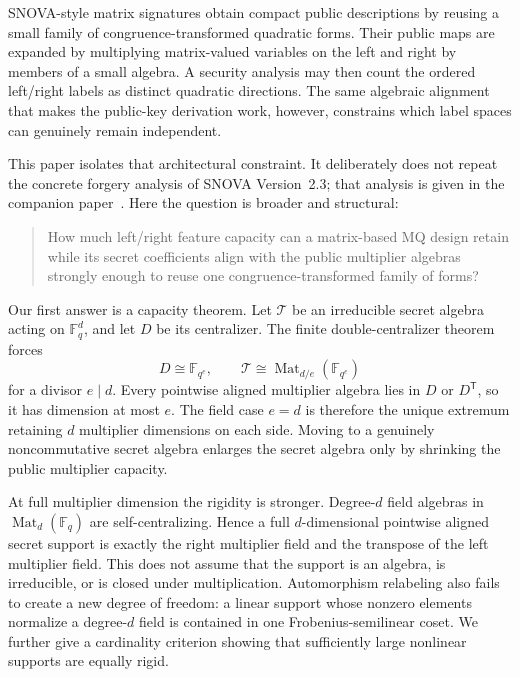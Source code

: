 \documentclass[11pt]{article}
\newcommand{\F}{\mathbb F}
\newcommand{\Mat}{\operatorname{Mat}}
\newcommand{\transpose}{\mathsf T}
\begin{document}
SNOVA-style matrix signatures obtain compact public descriptions by reusing a
small family of congruence-transformed quadratic forms.  Their public maps are
expanded by multiplying matrix-valued variables on the left and right by
members of a small algebra.  A security analysis may then count the ordered
left/right labels as distinct quadratic directions.  The same algebraic
alignment that makes the public-key derivation work, however, constrains which
label spaces can genuinely remain independent.

This paper isolates that architectural constraint.  It deliberately does not
repeat the concrete forgery analysis of SNOVA Version~2.3; that analysis is
given in the companion paper~\cite{ThalerEtAl2026SymmetryQuotient}.  Here the
question is broader and structural:

\begin{quote}
How much left/right feature capacity can a matrix-based MQ design retain while
its secret coefficients align with the public multiplier algebras strongly
enough to reuse one congruence-transformed family of forms?
\end{quote}

Our first answer is a capacity theorem.  Let $\mathcal T$ be an irreducible
secret algebra acting on $\F_q^d$, and let $D$ be its centralizer.  The finite
double-centralizer theorem forces
\[
  D\cong\F_{q^e},\qquad
  \mathcal T\cong\Mat_{d/e}(\F_{q^e})
\]
for a divisor $e\mid d$.  Every pointwise aligned multiplier algebra lies in
$D$ or $D^\transpose$, so it has dimension at most $e$.  The field case
$e=d$ is therefore the unique extremum retaining $d$ multiplier dimensions on
each side.  Moving to a genuinely noncommutative secret algebra enlarges the
secret algebra only by shrinking the public multiplier capacity.

At full multiplier dimension the rigidity is stronger.  Degree-$d$ field
algebras in $\Mat_d(\F_q)$ are self-centralizing.  Hence a full
$d$-dimensional pointwise aligned secret support is exactly the right
multiplier field and the transpose of the left multiplier field.  This does
not assume that the support is an algebra, is irreducible, or is closed under
multiplication.  Automorphism relabeling also fails to create a new degree of
freedom: a linear support whose nonzero elements normalize a degree-$d$ field
is contained in one Frobenius-semilinear coset.  We further give a cardinality
criterion showing that sufficiently large nonlinear supports are equally
rigid.
\end{document}

